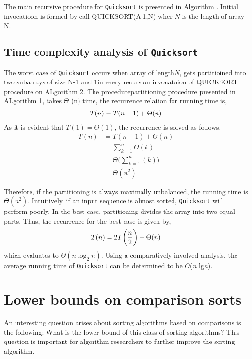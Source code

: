 \documentclass[a4paper,10pt,twocolumn]{article}
\begin{document}
The main recursive procedure for {\tt Quicksort} is presented in Algorithm . Initial invocatioon is formed by call QUICKSORT(A,1,N) wher {\it N} is the length of array N.
\subsection{Time complexity analysis of {\tt Quicksort}}
The worst case of {\tt Quicksort} occurs when array of length{\it N}, gets partitioined into two subarrays of size N-1 and 1in every recursion invocatoion of QUICKSORT procedure on ALgorithm 2. The procedurepartitioning procedure presented in ALgorithm 1, takes $\Theta$ (n) time, the recurrence relation for running time is, 
\begin{align*}
\centering
T(n)=T(n-1) + \Theta (n)
\end{align*}
As it is evident that $T(1)=\Theta (1)$, the recurrence is solved as follows,
\begin{align*}
T(n) &= T(n-1) + \Theta (n) \\
&= \sum_{k=1}^{n} \Theta (k) \\
&= \Theta\bigg(\sum_{k=1}^{n} (k)\bigg) \\
&= \Theta(n^2)
\end{align*}

Therefore, if the partitioning is always maximally unbalanced, the running time is $\Theta (n^2)$. Intuitively, if an input sequence is almost sorted, {\tt Quicksort} will perform poorly. In the best case, partitioning divides the array into two equal parts. Thus, the recurrence for the best case is given by,
\begin{equation*}
\centering
T(n)=2T\bigg(\frac{n}{2}\bigg) + \Theta (n)
\end{equation*}
which evaluates to $\Theta (n \log_2 n)$. Using a comparatively involved analysis, the average running time of {\tt Quicksort} can be determined to be $O$({\it n} lg{\it n}).
\section{Lower bounds on comparison sorts}
An interesting question arises about sorting algorithms based on comparisons is the following: What is the lower bound of this class of sorting algorithms? This question is important for algorithm researchers to further improve the sorting algorithm.
\end{document}
